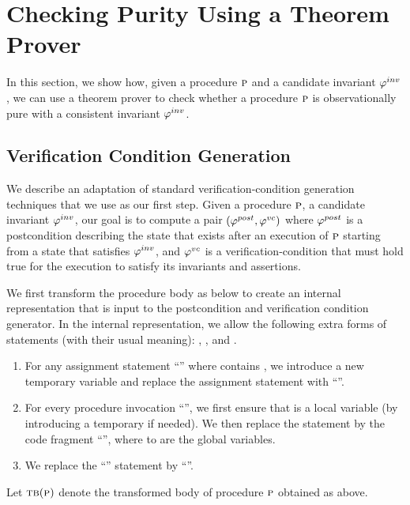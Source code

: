 \newcommand{\existformula}{\psi^e}
\newcommand{\EA}{\textsc{ea}}
\newcommand{\IW}{\textsc{iw}}

\newcommand{\initformula}{\logicalformula{init}}

\section{Checking Purity Using a Theorem Prover}

In this section, we show how, given a procedure $\textsc{p}$ and a candidate invariant $\varphi^{inv}$, we can use a theorem prover
to check whether a procedure $\textsc{p}$ is observationally pure with a consistent invariant $\varphi^{inv}$.



\subsection{Verification Condition Generation}

We describe an adaptation of standard verification-condition generation techniques that we use as our first step.
Given a procedure $\textsc{p}$, a candidate invariant $\varphi^{inv}$, our goal is to compute a
pair $(\varphi^{post},\varphi^{vc})$ where $\varphi^{post}$ is a postcondition describing the state that exists after an execution of
$\textsc{p}$ starting from a state that satisfies $\varphi^{inv}$, and $\varphi^{vc}$ is a verification-condition that must hold true
for the execution to satisfy its invariants and assertions.

We first transform the procedure body as below to create an internal representation that is input to the
postcondition and verification condition generator. In the internal representation, we allow the following
extra forms of statements (with their usual meaning): , , and  .
\begin{enumerate}
\item For any assignment statement ``'' where  contains , we introduce a new temporary
variable  and replace the assignment statement with ``''.
\item For every procedure invocation ``'', we first ensure that  is a local variable (by introducing
a temporary if needed). We then replace the statement by the code fragment
``'',
where  to  are the global variables.
\item We replace the ``'' statement by ``''.
\end{enumerate}
Let $\textsc{tb}(\textsc{p})$ denote the transformed body of procedure $\textsc{p}$ obtained as above.

